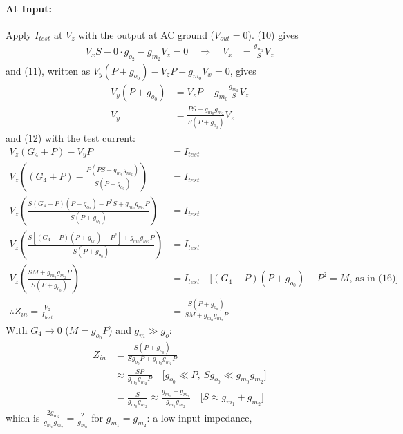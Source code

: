 \begin{enumerate}
    \paragraph{At Input:} Apply \(I_{test}\) at \(V_{z}\) with the output at AC
      ground (\(V_{out} = 0\)). (10) gives
      \begin{align*}
        V_{x} S - 0 \cdot g_{o_2} - g_{m_2} V_{z} = 0 \quad \Rightarrow \quad V_{x} &= \frac{g_{m_2}}{S} V_{z}
      \end{align*}
      and (11), written as \(V_{y}(P + g_{o_0}) - V_{z} P + g_{m_0} V_{x} = 0\), gives
      \begin{align*}
        V_{y}(P + g_{o_0}) &= V_{z} P - g_{m_0} \frac{g_{m_2}}{S} V_{z} \\
        V_{y} &= \frac{P S - g_{m_0} g_{m_2}}{S (P + g_{o_0})} V_{z}
      \end{align*}
      and (12) with the test current:
      \begin{align*}
        V_{z}(G_4 + P) - V_{y} P &= I_{test} \\
        V_{z}\left( (G_4 + P) - \frac{P(P S - g_{m_0} g_{m_2})}{S (P + g_{o_0})} \right) &= I_{test} \\
        V_{z}\left( \frac{S (G_4 + P)(P + g_{o_0}) - P^2 S + g_{m_0} g_{m_2} P}{S (P + g_{o_0})} \right) &= I_{test} \\
        V_{z}\left( \frac{S\left[(G_4 + P)(P + g_{o_0}) - P^2\right] + g_{m_0} g_{m_2} P}{S (P + g_{o_0})} \right) &= I_{test} \\
        V_{z}\left( \frac{S M + g_{m_0} g_{m_2} P}{S (P + g_{o_0})} \right) &= I_{test} \quad \text{[} (G_4 + P)(P + g_{o_0}) - P^2 = M \text{, as in (16)]} \\
        \therefore Z_{in} = \frac{V_{z}}{I_{test}} &= \frac{S (P + g_{o_0})}{S M + g_{m_0} g_{m_2} P}
      \end{align*}
      With \(G_4 \to 0\) (\(M = g_{o_0} P\)) and \(g_m \gg g_o\):
      \begin{align*}
        Z_{in} &= \frac{S (P + g_{o_0})}{S g_{o_0} P + g_{m_0} g_{m_2} P} \\
               &\approx \frac{S P}{g_{m_0} g_{m_2} P} \quad \text{[} g_{o_0} \ll P,\ S g_{o_0} \ll g_{m_0} g_{m_2} \text{]} \\
               &= \frac{S}{g_{m_0} g_{m_2}} \approx \frac{g_{m_1} + g_{m_2}}{g_{m_0} g_{m_2}} \quad \text{[} S \approx g_{m_1} + g_{m_2} \text{]}
      \end{align*}
      which is \(\frac{2 g_{m_2}}{g_{m_0} g_{m_2}} = \frac{2}{g_{m_0}}\) for \(g_{m_1} = g_{m_2}\): a low input impedance,

\end{enumerate}

